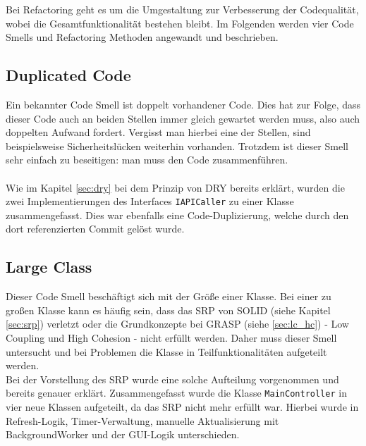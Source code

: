 Bei Refactoring geht es um die Umgestaltung zur Verbesserung der Codequalität, wobei die Gesamtfunktionalität bestehen bleibt.
Im Folgenden werden vier Code Smells und Refactoring Methoden angewandt und beschrieben.


\subsection{Duplicated Code}
Ein bekannter Code Smell ist doppelt vorhandener Code.
Dies hat zur Folge, dass dieser Code auch an beiden Stellen immer gleich gewartet werden muss, also auch doppelten Aufwand fordert.
Vergisst man hierbei eine der Stellen, sind beispielsweise Sicherheitslücken weiterhin vorhanden.
Trotzdem ist dieser Smell sehr einfach zu beseitigen: man muss den Code zusammenführen.\\
\\
Wie im Kapitel \ref{sec:dry} bei dem Prinzip von DRY bereits erklärt, wurden die zwei Implementierungen des Interfaces \texttt{IAPICaller}  zu einer Klasse zusammengefasst.
Dies war ebenfalls eine Code-Duplizierung, welche durch den dort referenzierten Commit gelöst wurde.

\subsection{Large Class}
Dieser Code Smell beschäftigt sich mit der Größe einer Klasse.
Bei einer zu großen Klasse kann es häufig sein, dass das SRP von SOLID (siehe Kapitel \ref{sec:srp}) verletzt oder die Grundkonzepte bei GRASP (siehe \ref{sec:lc_hc}) - Low Coupling und High Cohesion - nicht erfüllt werden.
Daher muss dieser Smell untersucht und bei Problemen die Klasse in Teilfunktionalitäten aufgeteilt werden.\\
Bei der Vorstellung des SRP wurde eine solche Aufteilung vorgenommen und bereits genauer erklärt.
Zusammengefasst wurde die Klasse \texttt{MainController} in vier neue Klassen aufgeteilt, da das SRP nicht mehr erfüllt war.
Hierbei wurde in Refresh-Logik, Timer-Verwaltung, manuelle Aktualisierung mit BackgroundWorker und der GUI-Logik unterschieden.


